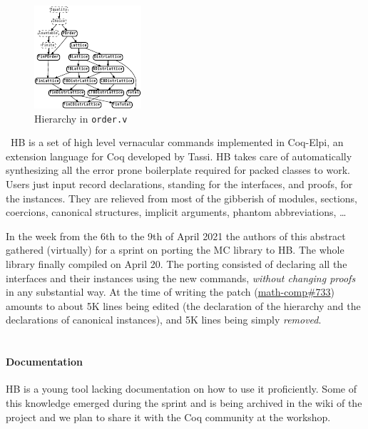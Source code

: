 \documentclass{easychair}
\def\MC{{\sf MC}}
\def\HB{{\sf HB}}
\begin{document}
\begin{figure}
  \vspace{-1em}
	\includegraphics[width=.35\textwidth]{order.pdf}
  \caption{\small Hierarchy in {\tt order.v}}
	\label{fig:order}

\end{figure}
\
\HB{} is a set of high level vernacular commands implemented in Coq-Elpi, an
extension language for Coq developed by Tassi. \HB{} takes
care of automatically synthesizing all the error prone boilerplate required for
packed classes to work. Users just input record declarations,
standing for the interfaces, and proofs, for the instances.
They are relieved from
most of the gibberish of modules, sections, coercions, canonical
structures, implicit arguments, phantom abbreviations, \ldots

In the week from the 6th to the 9th of April 2021 the authors of this abstract
gathered (virtually) for a sprint on porting the \MC{} library to
\HB{}. The whole library finally compiled on April 20.
The porting consisted of declaring all the interfaces and their instances
using the new commands, \emph{without changing proofs} in any substantial way.
At the time of writing the patch (\href{https://github.com/math-comp/math-comp/pull/733}{math-comp\#733})
amounts to about 5K lines being edited (the declaration of the hierarchy and
the declarations of canonical instances), and 5K lines being simply \emph{removed}.\\
\
\paragraph{Documentation}
\HB{} is a young tool lacking documentation
on how to use it proficiently. Some of this knowledge emerged
during the sprint and is being archived in the wiki of the project
and we plan to share it with the Coq community at the workshop.
\end{document}
